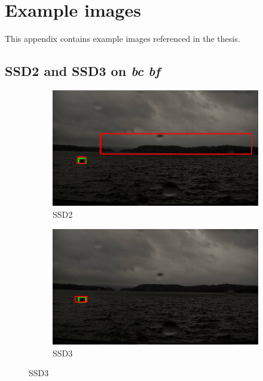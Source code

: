 
\chapter{Example images}
This appendix contains example images referenced in the thesis.


\newpage

\section{SSD2 and SSD3 on \textit{bc} \textit{bf}}
\label{sec:bigbox}

\begin{figure}[h!]
\begin{subfigure}{.5\textwidth}
  \centering
  \includegraphics[width=0.9\linewidth]{results/case_buildings/bigbox_bcbf/SSD2/selected_06_14_axis0049.jpg}
  \caption{SSD2}
  \label{fig:sfig1}
\end{subfigure}%
\begin{subfigure}{.5\textwidth}
  \centering
  \includegraphics[width=.9\linewidth]{results/case_buildings/bigbox_bcbf/SSD3/selected_06_14_axis0049.jpg}
  \caption{SSD3}
  \label{fig:sfig2}
\end{subfigure}


\end{figure}
